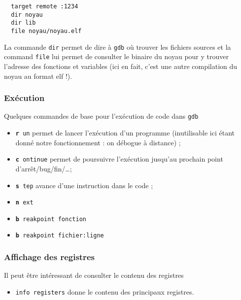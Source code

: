 \begin{verbatim}
  target remote :1234
  dir noyau
  dir lib
  file noyau/noyau.elf
\end{verbatim}

   La commande \lstinline!dir! permet de dire à {\tt gdb} où trouver
les fichiers sources et la command \lstinline:file: lui permet de
consulter le binaire du noyau pour y trouver l'adresse des fonctions
et variables (ici en fait, c'est une autre compilation du noyau au
format {\sc elf} !).

%
\subsubsection{Exécution}

   Quelques commandes de base pour l'exécution de code dans {\tt gdb}

\begin{itemize}
     \item {\tt {\bf r} un} permet de lancer l'exécution d'un
       programme (inutilisable ici étant donné notre fonctionnement :
       on débogue à distance) ;
     \item {\tt {\bf c} ontinue} permet de poursuivre l'exécution jusqu'au
       prochain point d'arrêt/bug/fin/\ldots ;
     \item {\tt {\bf s} tep} avance d'une instruction dans le code ;
     \item {\tt {\bf n} ext}
     \item {\tt {\bf b} reakpoint fonction}
     \item {\tt {\bf b} reakpoint fichier:ligne}
\end{itemize}

%
\subsubsection{Affichage des registres}

   Il peut être intéressant de consulter le contenu des registres

\begin{itemize}
     \item {\tt info registers} donne le contenu des principaux registres.
\end{itemize}

